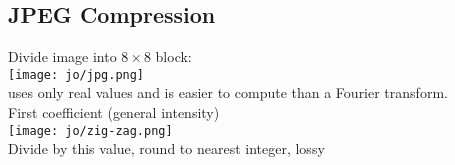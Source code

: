 \subsection*{JPEG Compression}
Divide image into $8 \times 8$ block:\\
\texttt{[image: jo/jpg.png]}\\
 uses only real values and is easier to compute than a Fourier transform.\\
 First coefficient (general intensity)\\
 \texttt{[image: jo/zig-zag.png]}\\
 Divide by this value, round to nearest integer, lossy